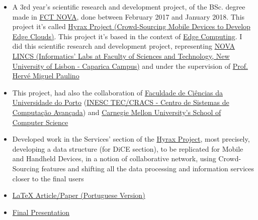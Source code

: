\documentclass[10pt,a4paper,academicons]{altacv}
\begin{document}
\begin{itemize}
\item A 3rd year's scientific research and development project, of the BSc. degree made in \href{https://www.fct.unl.pt/}{FCT NOVA}, done between February 2017 and January 2018. This project it's called \href{http://hyrax.dcc.fc.up.pt/}{Hyrax Project (Crowd-Sourcing Mobile Devices to Develop Edge Clouds)}. This project it's based in the context of \href{https://en.wikipedia.org/wiki/Edge_computing}{Edge Computing}. I did this scientific research and development project, representing \href{http://nova-lincs.di.fct.unl.pt/}{NOVA LINCS (Informatics' Labs at Faculty of Sciences and Technology, New University of Lisbon - Caparica Campus)} and under the supervision of \href{https://docentes.fct.unl.pt/p161/}{Prof. Hervé Miguel Paulino}
\item This project, had also the collaboration of \href{https://www.fc.up.pt/fcup/index.php}{Faculdade de Ciências da Universidade do Porto} (\href{https://cracs.fc.up.pt/}{INESC TEC/CRACS - Centro de Sistemas de Computação Avançada}) and \href{https://www.cmu.edu/}{Carnegie Mellon University's School of Computer Science}
\item Developed work in the Services' section of the \href{http://hyrax.dcc.fc.up.pt/}{Hyrax Project}, most precisely, developing a data structure (for DiCE section), to be replicated for Mobile and Handheld Devices, in a notion of collaborative network, using Crowd-Sourcing features and shifting all the data processing and information services closer to the final users
\item \href{https://rubenandrebarreiro.github.io/research-development/hyrax-dice/report-article/hyrax-dice-report-article.pdf}{LaTeX Article/Paper (Portuguese Version)}
\item \href{https://rubenandrebarreiro.github.io/research-development/hyrax-dice/presentation/hyrax-dice-presentation.pdf}{Final Presentation}
\end{itemize}

\divider


\nocite{*}



\end{document}
